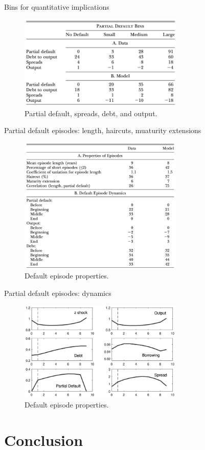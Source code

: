 \documentclass{beamer}
\begin{document}
\begin{frame}{Bins for quantitative implications}
        \begin{figure}
            \includegraphics[width=0.7\textwidth]{../outputs/tab_5.png}
            \caption{Partial default, spreads, debt, and output.}
        \end{figure}
\end{frame}

\begin{frame}{Partial default episodes: length, haircuts, muaturity extensions}
    \begin{figure}
        \includegraphics[width=0.7\textwidth]{../outputs/tab_6.png}
        \caption{Default episode properties.}
    \end{figure}
\end{frame}

\begin{frame}{Partial default episodes: dynamics}
    \begin{figure}
        \includegraphics[width=0.7\textwidth]{../outputs/fig_4.png}
        \caption{Default episode properties.}
    \end{figure}
\end{frame}

\section{Conclusion}
\end{document}
